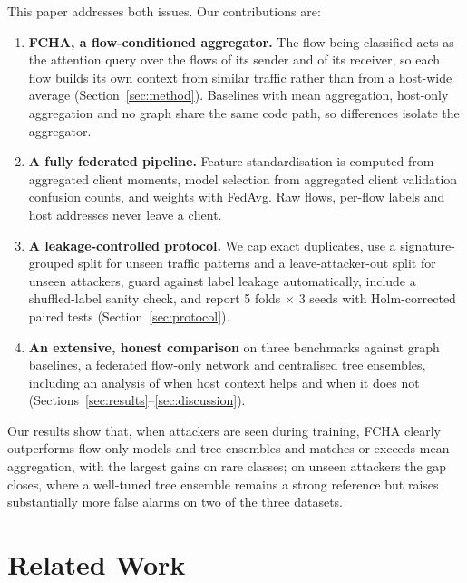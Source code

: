 \documentclass[journal]{IEEEtran}
\begin{document}
This paper addresses both issues. Our contributions are:
\begin{enumerate}
\item \textbf{FCHA, a flow-conditioned aggregator.} The flow being classified acts as the attention query over the flows of its sender and of its receiver, so each flow builds its own context from similar traffic rather than from a host-wide average (Section~\ref{sec:method}). Baselines with mean aggregation, host-only aggregation and no graph share the same code path, so differences isolate the aggregator.
\item \textbf{A fully federated pipeline.} Feature standardisation is computed from aggregated client moments, model selection from aggregated client validation confusion counts, and weights with FedAvg. Raw flows, per-flow labels and host addresses never leave a client.
\item \textbf{A leakage-controlled protocol.} We cap exact duplicates, use a signature-grouped split for unseen traffic patterns and a leave-attacker-out split for unseen attackers, guard against label leakage automatically, include a shuffled-label sanity check, and report 5 folds $\times$ 3 seeds with Holm-corrected paired tests (Section~\ref{sec:protocol}).
\item \textbf{An extensive, honest comparison} on three benchmarks against graph baselines, a federated flow-only network and centralised tree ensembles, including an analysis of when host context helps and when it does not (Sections~\ref{sec:results}--\ref{sec:discussion}).
\end{enumerate}

Our results show that, when attackers are seen during training, FCHA clearly outperforms flow-only models and tree ensembles and matches or exceeds mean aggregation, with the largest gains on rare classes; on unseen attackers the gap closes, where a well-tuned tree ensemble remains a strong reference but raises substantially more false alarms on two of the three datasets.

\section{Related Work}
\label{sec:related}
\end{document}
